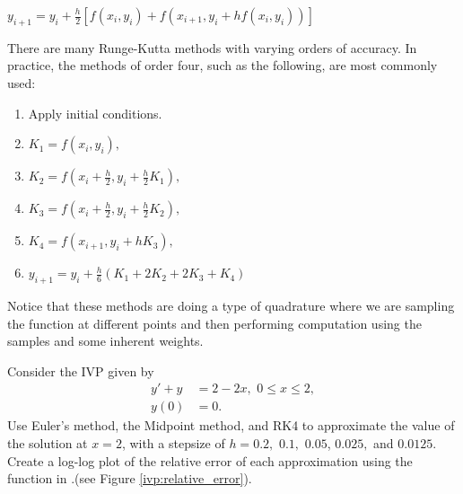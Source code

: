 $y_{i+1} = y_i + \frac{h}{2}[ f(x_i, y_i) + f(x_{i+1}, y_i+ hf(x_i, y_i))]$

There are many Runge-Kutta methods with varying orders of accuracy. In practice, the methods of order four, such as the following, are most commonly used: 
\begin{enumerate}
\item Apply initial conditions.
\item $K_1 = f(x_i,y_i),$
\item $K_2 = f(x_i + \frac{h}{2}, y_i + \frac{h}{2} K_1),$
\item $K_3 = f(x_i + \frac{h}{2} , y_i + \frac{h}{2} K_2),$
\item $K_4 = f(x_{i+1} , y_i + h K_3),$
\item $y_{i+1} = y_i + \frac{h}{6}(K_1 + 2K_2 + 2K_3 + K_4)$
\end{enumerate}

\begin{comment}
\begin{problem}
Suppose a differential equation is given by
\[ y' = f(t).\]
If we were to solve this by just integrating, which integration approximation method would correspond to Euler's method, backward Euler's method, modified Euler's method, the Midpoint method, and the fourth order Runge-Kutta method (RK4)? 
\end{problem}
\end{comment}

Notice that these methods are doing a type of quadrature where we are sampling the function at different points and then performing computation using the samples and some inherent weights.

\begin{problem} Consider the IVP given by 
\begin{align*}
y' + y &= 2-2x,\,\, 0 \leq x \leq 2, \\
y(0) &= 0.
\end{align*}
Use Euler's method, the Midpoint method, and RK4 to approximate the value of the solution at $x = 2$, with a stepsize of $h = 0.2,$ $ 0.1,$ $0.05 $, $0.025,$ and $0.0125.$ Create a log-log plot of the relative error of each approximation using the  function in .(see Figure \ref{ivp:relative_error}).
\end{problem}


